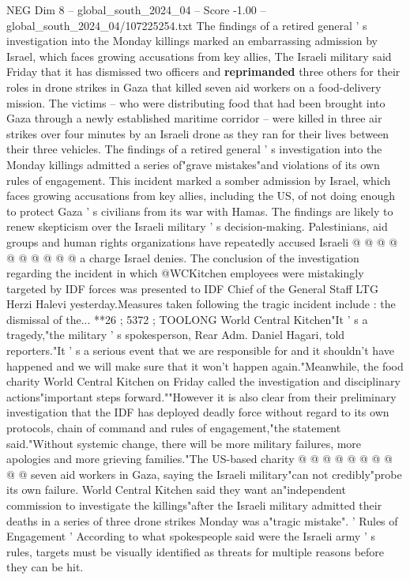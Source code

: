 \begin{textsample}{NEG Dim 8 – global\_south\_2024\_04 – Score -1.00 – global\_south\_2024\_04/107225254.txt}  \label{ex:f8_neg_035}
The findings of a retired general ' s investigation into the Monday killings marked an embarrassing admission by Israel, which faces growing accusations from key allies, The Israeli military said Friday that it has dismissed two officers and \textbf{reprimanded} three others for their roles in drone strikes in Gaza that killed seven aid workers on a food-delivery mission.
The victims -- who were distributing food that had been brought into Gaza through a newly established maritime corridor -- were killed in three air strikes over four minutes by an Israeli drone as they ran for their lives between their three vehicles.
The findings of a retired general ' s investigation into the Monday killings admitted a series of"grave mistakes"and violations of its own rules of engagement.
This incident marked a somber admission by Israel, which faces growing accusations from key allies, including the US, of not doing enough to protect Gaza ' s civilians from its war with Hamas.
The findings are likely to renew skepticism over the Israeli military ' s decision-making.
Palestinians, aid groups and human rights organizations have repeatedly accused Israeli @ @ @ @ @ @ @ @ @ @ a charge Israel denies.
The conclusion of the investigation regarding the incident in which @WCKitchen employees were mistakingly targeted by IDF forces was presented to IDF Chief of the General Staff LTG Herzi Halevi yesterday.Measures taken following the tragic incident include : the dismissal of the... **26 ; 5372 ; TOOLONG World Central Kitchen"It ' s a tragedy,"the military ' s spokesperson, Rear Adm.
Daniel Hagari, told reporters."It ' s a serious event that we are responsible for and it shouldn't have happened and we will make sure that it won't happen again."Meanwhile, the food charity World Central Kitchen on Friday called the investigation and disciplinary actions"important steps forward.""However it is also clear from their preliminary investigation that the IDF has deployed deadly force without regard to its own protocols, chain of command and rules of engagement,"the statement said."Without systemic change, there will be more military failures, more apologies and more grieving families."The US-based charity @ @ @ @ @ @ @ @ @ @ seven aid workers in Gaza, saying the Israeli military"can not credibly"probe its own failure.
World Central Kitchen said they want an"independent commission to investigate the killings"after the Israeli military admitted their deaths in a series of three drone strikes Monday was a"tragic mistake". ' Rules of Engagement ' According to what spokespeople said were the Israeli army ' s rules, targets must be visually identified as threats for multiple reasons before they can be hit.

\end{textsample}
